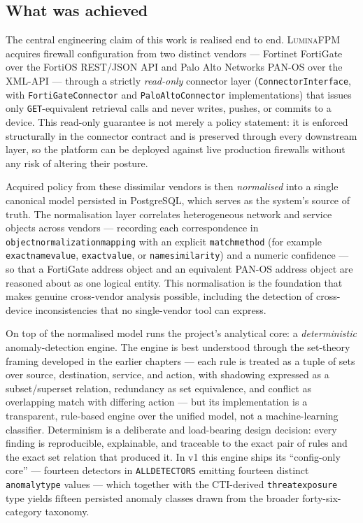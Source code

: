 \documentclass[12pt,a4paper]{report}
\renewcommand{\_}{\textunderscore\allowbreak}
\begin{document}
\subsection{What was achieved}
\label{sec:ch5-achieved}

The central engineering claim of this work is realised end to end. \textsc{LuminaFPM} acquires firewall configuration from two distinct vendors --- Fortinet FortiGate over the FortiOS REST/JSON API and Palo Alto Networks PAN-OS over the XML-API --- through a strictly \emph{read-only} connector layer (\texttt{ConnectorInterface}, with \texttt{FortiGateConnector} and \texttt{PaloAltoConnector} implementations) that issues only \texttt{GET}-equivalent retrieval calls and never writes, pushes, or commits to a device. This read-only guarantee is not merely a policy statement: it is enforced structurally in the connector contract and is preserved through every downstream layer, so the platform can be deployed against live production firewalls without any risk of altering their posture.

Acquired policy from these dissimilar vendors is then \emph{normalised} into a single canonical model persisted in PostgreSQL, which serves as the system's source of truth. The normalisation layer correlates heterogeneous network and service objects across vendors --- recording each correspondence in \texttt{object\_normalization\_mapping} with an explicit \texttt{match\_method} (for example \texttt{exact\_name\_value}, \texttt{exact\_value}, or \texttt{name\_similarity}) and a numeric confidence --- so that a FortiGate address object and an equivalent PAN-OS address object are reasoned about as one logical entity. This normalisation is the foundation that makes genuine cross-vendor analysis possible, including the detection of cross-device inconsistencies that no single-vendor tool can express.

On top of the normalised model runs the project's analytical core: a \emph{deterministic} anomaly-detection engine. The engine is best understood through the set-theory framing developed in the earlier chapters --- each rule is treated as a tuple of sets over source, destination, service, and action, with shadowing expressed as a subset/superset relation, redundancy as set equivalence, and conflict as overlapping match with differing action --- but its implementation is a transparent, rule-based engine over the unified model, not a machine-learning classifier. Determinism is a deliberate and load-bearing design decision: every finding is reproducible, explainable, and traceable to the exact pair of rules and the exact set relation that produced it. In v1 this engine ships its ``config-only core'' --- fourteen detectors in \texttt{ALL\_DETECTORS} emitting fourteen distinct \texttt{anomaly\_type} values --- which together with the CTI-derived \texttt{threat\_exposure} type yields fifteen persisted anomaly classes drawn from the broader forty-six-category taxonomy.
\end{document}
